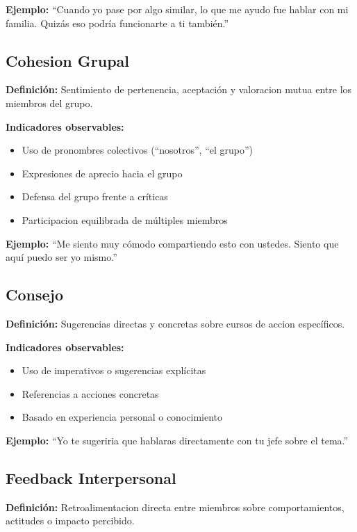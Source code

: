 \documentclass[12pt,a4paper,twoside]{book}
\begin{document}
\textbf{Ejemplo:} ``Cuando yo pase por algo similar, lo que me ayudo fue hablar con mi familia. Quizás eso podría funcionarte a ti también.''

\subsection{Cohesion Grupal}

\textbf{Definición:} Sentimiento de pertenencia, aceptación y valoracion mutua entre los miembros del grupo.

\textbf{Indicadores observables:}
\begin{itemize}
    \item Uso de pronombres colectivos (``nosotros'', ``el grupo'')
    \item Expresiones de aprecio hacia el grupo
    \item Defensa del grupo frente a críticas
    \item Participacion equilibrada de múltiples miembros
\end{itemize}

\textbf{Ejemplo:} ``Me siento muy cómodo compartiendo esto con ustedes. Siento que aquí puedo ser yo mismo.''

\subsection{Consejo}

\textbf{Definición:} Sugerencias directas y concretas sobre cursos de accion específicos.

\textbf{Indicadores observables:}
\begin{itemize}
    \item Uso de imperativos o sugerencias explícitas
    \item Referencias a acciones concretas
    \item Basado en experiencia personal o conocimiento
\end{itemize}

\textbf{Ejemplo:} ``Yo te sugeriria que hablaras directamente con tu jefe sobre el tema.''

\subsection{Feedback Interpersonal}

\textbf{Definición:} Retroalimentacion directa entre miembros sobre comportamientos, actitudes o impacto percibido.
\end{document}
